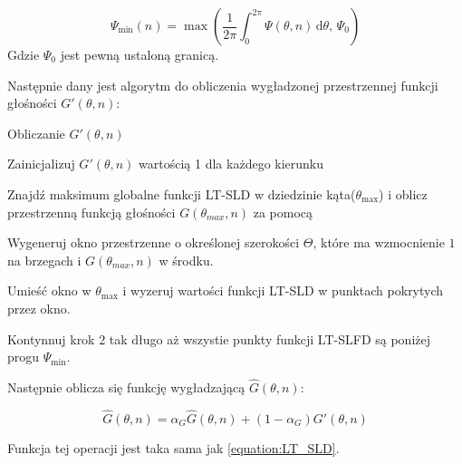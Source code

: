 \begin{equation}
    \Psi_{\min}(n)=
    \max({\dfrac{1}{2\pi} \int_{0}^{2\pi} \Psi(\theta,n) \, \mathrm{d}\theta, \, \Psi_{0}})
\end{equation}
Gdzie $\Psi_{0}$ jest pewną ustaloną granicą.

\newpage

\noindent Następnie  dany jest algorytm do obliczenia wygładzonej przestrzennej funkcji głośności $G'(\theta,n)$:


\begin{algorithm}
  \label{alg:gprim}
  \caption{Obliczanie $G'(\theta,n)$}
  \begin{algorithmic}[1]
    \State Zainicjalizuj $G'(\theta,n)$ wartością 1 dla każdego kierunku
    
    \State  Znajdź maksimum globalne funkcji LT-SLD w dziedzinie kąta($\theta_{\max}$) i oblicz przestrzenną funkcją głośności $G(\theta_{max},n)$ za pomocą
    
    \State Wygeneruj okno przestrzenne o określonej szerokości $\Theta$, które ma wzmocnienie $1$ na brzegach i $G(\theta_{max},n)$ w środku.
    
    \State Umieść okno w $\theta_{\max}$ i wyzeruj wartości funkcji LT-SLD w punktach pokrytych przez okno.
    
    \State Kontynnuj krok 2 tak długo aż wszystie punkty funkcji LT-SLFD są poniżej progu $\Psi_{\min}$.
  \end{algorithmic}
\end{algorithm}

\noindent Następnie oblicza się funkcję wygładzającą $\widehat{G}(\theta,n)$:

\begin{equation}
    \label{equation:Ghat}
    \widehat{G}(\theta,n)=
    \alpha_{G}\widehat{G}(\theta,n)
    + (1-\alpha_{G})G'(\theta,n)
\end{equation}


\noindent Funkcja tej operacji jest taka sama jak \ref{equation:LT_SLD}.





